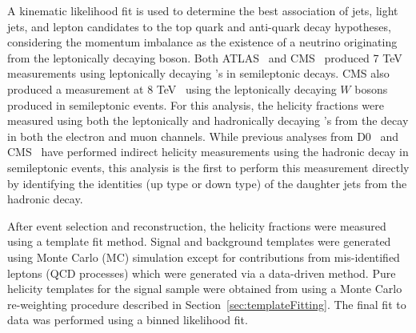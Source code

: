 A kinematic likelihood fit is used to determine the best association of \bt jets, light jets, and lepton candidates to the top quark and anti-quark decay hypotheses, considering the momentum imbalance as the existence of a neutrino originating from the leptonically decaying \w boson. Both ATLAS~\cite{Aad:2012ky} and CMS~\cite{Chatrchyan:2013jna} produced 7 TeV measurements using leptonically decaying \w's in semileptonic \ttbar decays. CMS also produced a measurement at 8 TeV~\cite{Khachatryan:2016fky} using the leptonically decaying $W$ bosons produced in semileptonic \ttbar events. For this analysis, the helicity fractions were measured using both the leptonically and hadronically decaying \w's from the \ttbar decay in both the electron and muon channels. While previous analyses from D0~\cite{Abazov:2007ve} and CMS~\cite{Chatrchyan:2013jna} have performed indirect helicity measurements using the hadronic \w decay in semileptonic \ttbar events, this analysis is the first to perform this measurement directly by identifying the identities (up type or down type) of the daughter jets from the hadronic \w decay.

After event selection and reconstruction, the helicity fractions were measured using a template fit method. Signal and background templates were generated using Monte Carlo (MC) simulation except for contributions from mis-identified leptons (QCD processes) which were generated via a data-driven method. Pure helicity templates for the signal sample were obtained from using a Monte Carlo re-weighting procedure described in Section~\ref{sec:templateFitting}. The final fit to data was performed using a binned likelihood fit.

